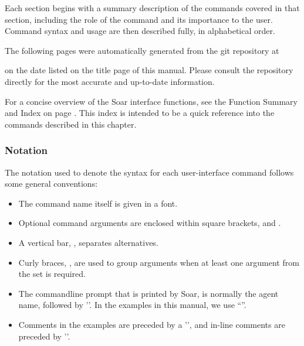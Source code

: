 Each section begins with a summary description of the commands covered in that section, including the role of the command and its importance to the user.  Command syntax and usage are then described fully, in alphabetical order.

The following pages were automatically generated from the git repository at

\hspace{2em}

on the date listed on the title page of this manual.  Please consult the repository directly for the most accurate and up-to-date information.

For a concise overview of the Soar interface functions, see the Function Summary and Index on page \pageref{func-sum}. This index is intended to be a quick reference into the commands described in this chapter.

\subsubsection*{Notation}


The notation used to denote the syntax for each user-interface command follows some general conventions:

\vspace{-12pt}
\begin{itemize}
	\item The command name itself is given in a  font.
	\vspace{-8pt}
	\item Optional command arguments are enclosed within square brackets, \soar{[} and \soar{]}.
	\vspace{-8pt}
	\item A vertical bar, \soar{|}, separates alternatives.
	\vspace{-8pt}
	\item Curly braces, \soar{\{\}}, are used to group arguments when at least one argument from the set is required.
	\vspace{-8pt}
	\item The commandline prompt that is printed by Soar, is normally the agent name, followed by '\soar{>}'.  In the examples in this manual, we use ``''.
	\vspace{-8pt}
	\item Comments in the examples are preceded by a '\soar{\#}', and in-line comments are preceded by '\soar{;\#}'.
	\vspace{-8pt}
\end{itemize}

